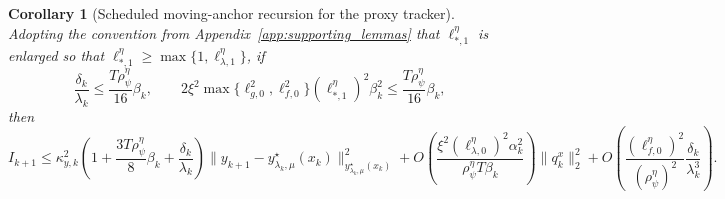 \documentclass{article}
\newtheorem{corollary}{Corollary}
\begin{document}
\begin{corollary}[Scheduled moving-anchor recursion for the proxy tracker]
\label{cor:y_moving_anchor_scheduled}
Adopting the convention from
Appendix~\ref{app:supporting_lemmas} that \(\ell_{*,1}^\eta\) is enlarged so that
\(\ell_{*,1}^\eta\ge\max\{1,\ell_{\lambda,1}^\eta\}\), if
\begin{equation}
\label{eq:proxy_recursion_schedule}
\frac{\delta_k}{\lambda_k}\le \frac{T\rho_\psi^\eta}{16}\beta_k,
\qquad
2\xi^2\max\{\ell_{g,0}^2,\ell_{f,0}^2\}(\ell_{*,1}^{\eta})^2\beta_k^2
\le
\frac{T\rho_\psi^\eta}{16}\beta_k,
\end{equation}
then
\begin{equation}
\label{eq:proxy_recursion_scheduled}
I_{k+1}
\le
\kappa_{y,k}^2
\left(1+\frac{3T\rho_\psi^\eta}{8}\beta_k+\frac{\delta_k}{\lambda_k}\right)
\big\|y_{k+1}-y_{\lambda_k,\mu}^\star(x_k)
\big\|_{y_{\lambda_k,\mu}^\star(x_k)}^2
+
O\!\left(
\frac{\xi^2(\ell_{\lambda,0}^{\eta})^2\alpha_k^2}{\rho_\psi^\eta T\beta_k}
\right)\|q_k^x\|_2^2
+
O\!\left(
\frac{(\ell_{f,0}^{\eta})^2}{(\rho_\psi^\eta)^2}
\frac{\delta_k}{\lambda_k^3}
\right).
\end{equation}
\end{corollary}
\end{document}
